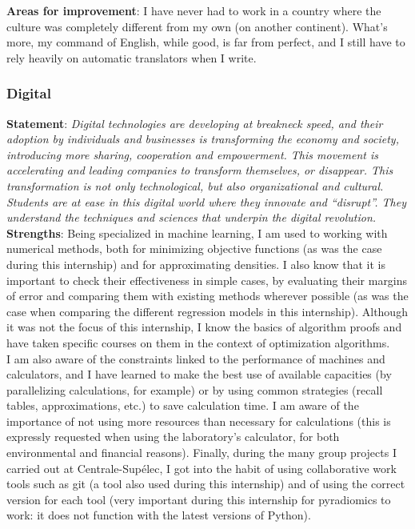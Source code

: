 \documentclass[preprint,12pt]{elsarticle}
\begin{document}
\noindent \textbf{Areas for improvement}: I have never had to work in a country where the culture was completely different from my own (on another continent). What's more, my command of English, while good, is far from perfect, and I still have to rely heavily on automatic translators when I write.

\subsubsection{Digital}

\noindent \textbf{Statement}: \textit{Digital technologies are developing at breakneck speed, and their adoption by individuals and businesses is transforming the economy and society, introducing more sharing, cooperation and empowerment. This movement is accelerating and leading companies to transform themselves, or disappear. This transformation is not only technological, but also organizational and cultural. Students are at ease in this digital world where they innovate and “disrupt”. They understand the techniques and sciences that underpin the digital revolution.}\\[3 pt]

\noindent \textbf{Strengths}: Being specialized in machine learning, I am used to working with numerical methods, both for minimizing objective functions (as was the case during this internship) and for approximating densities. I also know that it is important to check their effectiveness in simple cases, by evaluating their margins of error and comparing them with existing methods wherever possible (as was the case when comparing the different regression models in this internship). Although it was not the focus of this internship, I know the basics of algorithm proofs and have taken specific courses on them in the context of optimization algorithms.\\
\indent I am also aware of the constraints linked to the performance of machines and calculators, and I have learned to make the best use of available capacities (by parallelizing calculations, for example) or by using common strategies (recall tables, approximations, etc.) to save calculation time. I am aware of the importance of not using more resources than necessary for calculations (this is expressly requested when using the laboratory's calculator, for both environmental and financial reasons). Finally, during the many group projects I carried out at Centrale-Supélec, I got into the habit of using collaborative work tools such as git (a tool also used during this internship) and of using the correct version for each tool (very important during this internship for pyradiomics to work: it does not function with the latest versions of Python).\\[3 pt]
\end{document}
